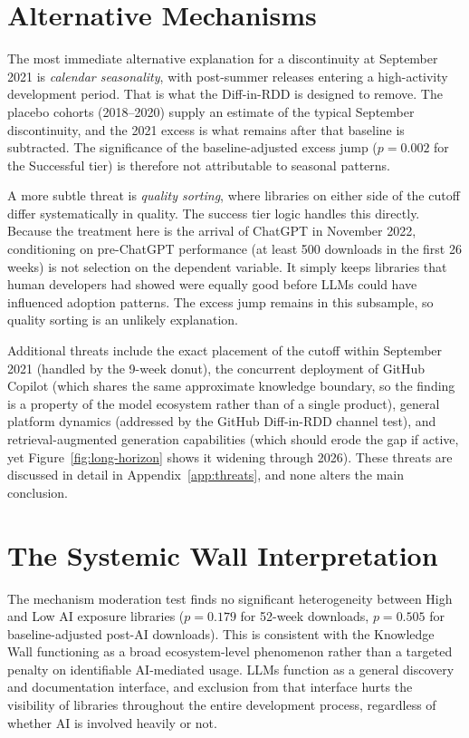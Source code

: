 \documentclass[12pt, a4paper]{report}
\begin{document}
\section{Alternative Mechanisms}\label{sec:disc-threats}
The most immediate alternative explanation for a discontinuity at September 2021 is \textit{calendar seasonality}, with post-summer releases entering a high-activity development period. That is what the Diff-in-RDD is designed to remove. The placebo cohorts (2018--2020) supply an estimate of the typical September discontinuity, and the 2021 excess is what remains after that baseline is subtracted. The significance of the baseline-adjusted excess jump ($p = 0.002$ for the Successful tier) is therefore not attributable to seasonal patterns.

A more subtle threat is \textit{quality sorting}, where libraries on either side of the cutoff differ systematically in quality. The success tier logic handles this directly. Because the treatment here is the arrival of ChatGPT in November 2022, conditioning on pre-ChatGPT performance (at least 500 downloads in the first 26 weeks) is not selection on the dependent variable. It simply keeps libraries that human developers had showed were equally good before LLMs could have influenced adoption patterns. The excess jump remains in this subsample, so quality sorting is an unlikely explanation.

Additional threats include the exact placement of the cutoff within September 2021 (handled by the 9-week donut), the concurrent deployment of GitHub Copilot (which shares the same approximate knowledge boundary, so the finding is a property of the model ecosystem rather than of a single product), general platform dynamics (addressed by the GitHub Diff-in-RDD channel test), and retrieval-augmented generation capabilities (which should erode the gap if active, yet Figure~\ref{fig:long-horizon} shows it widening through 2026). These threats are discussed in detail in Appendix~\ref{app:threats}, and none alters the main conclusion.

\section{The Systemic Wall Interpretation}\label{sec:disc-systemic}
The mechanism moderation test finds no significant heterogeneity between High and Low AI exposure libraries ($p = 0.179$ for 52-week downloads, $p = 0.505$ for baseline-adjusted post-AI downloads). This is consistent with the Knowledge Wall functioning as a broad ecosystem-level phenomenon rather than a targeted penalty on identifiable AI-mediated usage. LLMs function as a general discovery and documentation interface, and exclusion from that interface hurts the visibility of libraries throughout the entire development process, regardless of whether AI is involved heavily or not.
\end{document}
